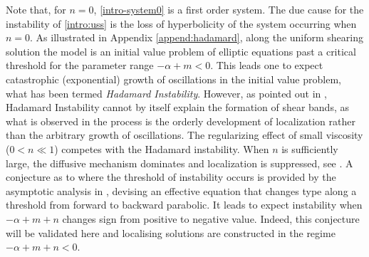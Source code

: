 \documentclass[a4paper,11pt]{article}
\theoremstyle{remark}
\begin{document}
Note that, for $n=0$, \eqref{intro-system0} is a first order system. The due cause for the instability of \eqref{intro:uss} is the loss of hyperbolicity of the system occurring when $n=0$.  As illustrated in Appendix \ref{append:hadamard}, along the uniform shearing solution the model is an initial value problem of elliptic equations past a critical threshold for the parameter range $-\alpha+m<0$. This leads one to expect catastrophic (exponential) growth of oscillations in the initial value problem, what has been termed {\it Hadamard Instability}. However, as pointed out in \cite{KOT14},  Hadamard Instability cannot by itself explain the formation of shear bands, 
as what is observed in the process is the orderly development of localization \cite{zener_effect_1944} rather than the arbitrary growth of oscillations. The regularizing effect of small viscosity ($0 < n \ll 1$) competes with the Hadamard instability.
When $n$ is sufficiently large, the diffusive mechanism dominates and localization is suppressed, see \cite{DH_1983, Tz_1986, tzavaras_nonlinear_1992}. 
A conjecture as to where the threshold of instability occurs is provided by the asymptotic analysis in  \cite{KT09}, devising
an effective equation that changes type along a threshold from forward to backward parabolic.
 It leads to expect instability when $-\alpha+m+n$ changes sign from positive to negative value. Indeed,
this conjecture will be validated here and localising solutions are constructed in the regime $-\alpha+m+n<0$.
\end{document}
